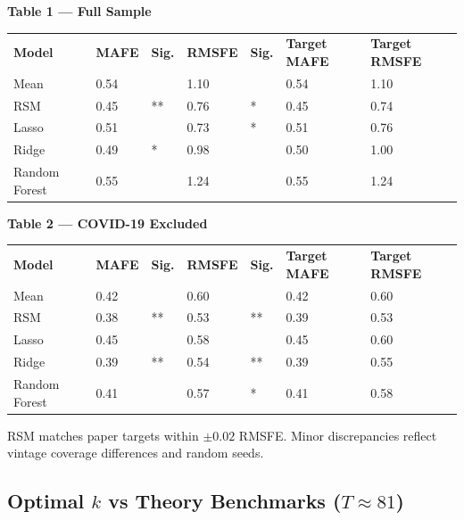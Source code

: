 \documentclass[11pt,a4paper]{article}
\begin{document}
\textbf{Table 1 — Full Sample}

\smallskip
\begin{tabular}{L{2.4cm} C{1.0cm} C{0.8cm} C{1.0cm} C{0.8cm} C{1.5cm} C{1.7cm}}
\color{white}\bfseries Model &
\color{white}\bfseries MAFE &
\color{white}\bfseries Sig. &
\color{white}\bfseries RMSFE &
\color{white}\bfseries Sig. &
\color{white}\bfseries Target MAFE &
\color{white}\bfseries Target RMSFE \\
Mean          & 0.54 &    & 1.10 &   & 0.54 & 1.10 \\
RSM           & 0.45 & ** & 0.76 & * & 0.45 & 0.74 \\
Lasso         & 0.51 &    & 0.73 & * & 0.51 & 0.76 \\
Ridge         & 0.49 & *  & 0.98 &   & 0.50 & 1.00 \\
Random Forest & 0.55 &    & 1.24 &   & 0.55 & 1.24 \\
\end{tabular}

\medskip\textbf{Table 2 — COVID-19 Excluded}

\smallskip
\begin{tabular}{L{2.4cm} C{1.0cm} C{0.8cm} C{1.0cm} C{0.8cm} C{1.5cm} C{1.7cm}}
\color{white}\bfseries Model &
\color{white}\bfseries MAFE &
\color{white}\bfseries Sig. &
\color{white}\bfseries RMSFE &
\color{white}\bfseries Sig. &
\color{white}\bfseries Target MAFE &
\color{white}\bfseries Target RMSFE \\
Mean          & 0.42 &    & 0.60 &    & 0.42 & 0.60 \\
RSM           & 0.38 & ** & 0.53 & ** & 0.39 & 0.53 \\
Lasso         & 0.45 &    & 0.58 &    & 0.45 & 0.60 \\
Ridge         & 0.39 & ** & 0.54 & ** & 0.39 & 0.55 \\
Random Forest & 0.41 &    & 0.57 & *  & 0.41 & 0.58 \\
\end{tabular}

\smallskip\noindent
{\small\color{dgrey}RSM matches paper targets within \(\pm0.02\) RMSFE.
Minor discrepancies reflect vintage coverage differences and random seeds.}

\subsection{Optimal \(k\) vs Theory Benchmarks (\(T\approx81\))}
\end{document}
